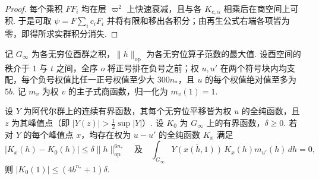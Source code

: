\begin{proof}
每个乘积 $FF_i$ 均在层 $\varpi^2$ 上快速衰减，且与各 $K_{c,\alpha}$ 相乘后在商空间上可积. 于是可取 $\psi=F\sum_i c_iF_i$ 并将有限和移出各积分；由再生公式右端各项皆为零，即得所求实群积分消失.
\end{proof}

\begin{lemma}[峰值点上的圆周平均估计]
\label{lem:c-kernel-peak-mean}
\emitthmsource
记 $G_\infty$ 为各无穷位酉群之积，$\|h\|_{\mathrm{op}}$ 为各无穷位算子范数的最大值. 设酉空间的秩介于 $1$ 与 $t$ 之间，全序 $o$ 将正号排在负号之前；权 $u,u'$ 在两个符号块内均支配，每个负号权值比任一正号权值至少大 $300n_*$，且 $u$ 的每个权值绝对值至多为 $5b$. 记 $m_v$ 为权 $v$ 的主子式商函数，归一化为 $m_v(1)=1$.

设 $Y$ 为阿代尔群上的连续有界函数，其每个无穷位平移皆为权 $u$ 的全纯函数，且 $z$ 为其峰值点（即 $|Y(z)|>\frac12\sup|Y|$）. 设 $K_0$ 为 $G_\infty$ 上的有界函数，$\delta\ge0$. 若对 $Y$ 的每个峰值点 $x$，均存在权为 $u-u'$ 的全纯函数 $K_x$ 满足
\[
 |K_x(h)-K_0(h)|\le\delta\|h\|_{\mathrm{op}}^{6n_*}
 \quad\text{及}\quad
 \int_{G_\infty}\overline{Y(x(h,1))}\,K_x(h)m_{u'}(h)\,dh=0 ,
\]
则 $|K_0(1)|\le(4b^{n_*}+1)\delta$.
\end{lemma}

